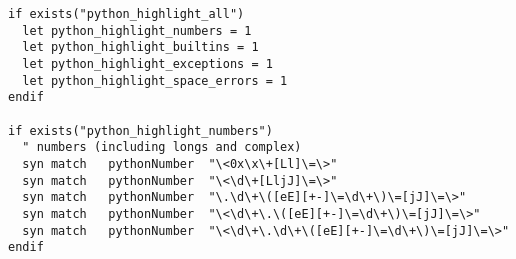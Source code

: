 \begin{framed}
\begin{verbatim}
if exists("python_highlight_all")
  let python_highlight_numbers = 1
  let python_highlight_builtins = 1
  let python_highlight_exceptions = 1
  let python_highlight_space_errors = 1
endif

if exists("python_highlight_numbers")
  " numbers (including longs and complex)
  syn match   pythonNumber	"\<0x\x\+[Ll]\=\>"
  syn match   pythonNumber	"\<\d\+[LljJ]\=\>"
  syn match   pythonNumber	"\.\d\+\([eE][+-]\=\d\+\)\=[jJ]\=\>"
  syn match   pythonNumber	"\<\d\+\.\([eE][+-]\=\d\+\)\=[jJ]\=\>"
  syn match   pythonNumber	"\<\d\+\.\d\+\([eE][+-]\=\d\+\)\=[jJ]\=\>"
endif

\end{verbatim}
 \end{framed}